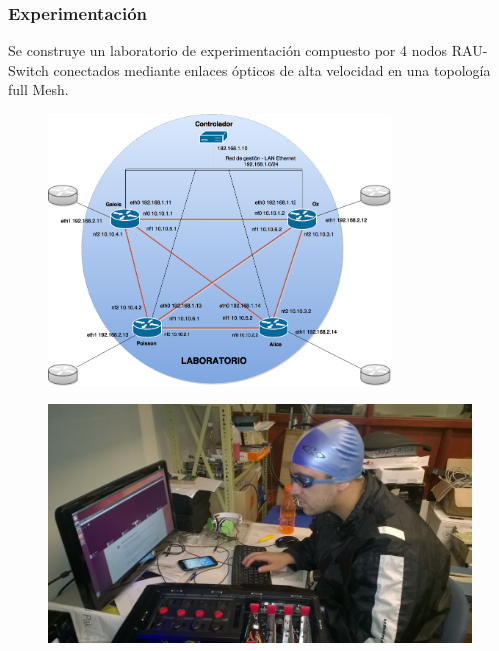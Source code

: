 \documentclass{beamer}
\begin{document}
\begin{frame}
\frametitle{Experimentaci\'on} 

Se construye un laboratorio de experimentaci\'on compuesto por 4 nodos RAU-Switch conectados mediante enlaces \'opticos de alta velocidad en una topolog\'ia full Mesh.

\vspace{0.5cm}
\begin{minipage}{0.60\textwidth}
\begin{figure}[htbp]
\centering
\includegraphics[width=0.81\textwidth]{imagenes/Topologia.png}
\end{figure}
\end{minipage}
\hfill
\begin{minipage}{0.35\textwidth}
\begin{figure}[H]
\centering
\includegraphics[width=1.0\textwidth]{imagenes/laboratorio.jpg}
\end{figure}
\end{minipage} 

\end{frame}
\end{document}
